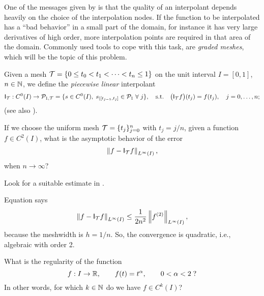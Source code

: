 
\begin{problem}
  \label{prb:GradedMeshes}

One of the messages given by 
is that the quality of an interpolant depends heavily on the choice of the
interpolation nodes.  If the function to be interpolated has a ``bad behavior'' in
a small part of the domain, for instance it has very large derivatives of high
order, more interpolation points are required in that area of the domain.
Commonly used tools to cope with this task, are \textit{graded meshes}, which
will be the topic of this problem.

\vspace{4mm}

Given a mesh ${\cal T}=\{0\le t_0<t_1<\cdots<t_n\le1\}$ on the unit interval $I=[0,1]$, $n\in\mathbb{N}$, we define the \textit{piecewise linear} interpolant
$$\mathsf{I}_{\cal T}:C^0(I)\rightarrow {\cal P}_{1,{\cal T}} = \{ s\in C^0(I),\; s_{|[t_{j-1},t_j]}\in{\cal P}_1\;\forall\;j \},
\quad\text{s.t.}\quad \big(\mathsf{I}_{\cal T} f\big) (t_j)=f(t_j),\quad j=0,\ldots,n; $$
(see also ).


\begin{subproblem}[2]
\label{subprb:GradedMeshes_1}
If we choose the uniform mesh ${\cal T}=\{t_j\}_{j=0}^n$ with $t_j=j/n$, given a function $f\in C^2(I)$, what is the asymptotic behavior of the error
$$\left\|{f-\mathsf{I}_{\cal T} f}\right\|_{L^\infty(I)},$$
when $n\rightarrow\infty$?

\begin{hint}
Look for a suitable estimate in .
\end{hint}

\begin{solution}
Equation  says
$$\left\|{f-\mathsf{I}_{\cal T} f}\right\|_{L^\infty(I)}  \leq \frac1{2n^2}\left\|{f^{(2)}}\right\|_{L^\infty(I)}, $$
because the meshwidth is $h=1/n$. So, the convergence is quadratic, i.e., algebraic with order 2.
\end{solution}
\end{subproblem}




\begin{subproblem}[2]\label{subprb:GradedMeshes_2}
What is the regularity of the function
$$f:I\rightarrow\mathbb{R},\qquad f(t)=t^\alpha, \qquad 0<\alpha<2\;?$$
In other words, for which $k\in\mathbb{N}$ do we have $f\in C^k(I)$? 


\end{subproblem}
\end{problem}
